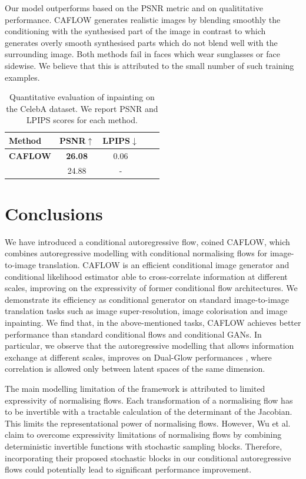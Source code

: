 Our model outperforms \cite{cGLOW} based on the PSNR metric and on qualititative performance. CAFLOW generates realistic images by blending smoothly the conditioning with the synthesised part of the image in contrast to \cite{cGLOW} which generates overly smooth synthesised parts which do not blend well with the surrounding image. Both methods fail in faces which wear sunglasses or face sidewise. We believe that this is attributed to the small number of such training examples.

\begin{table}[h!]
    \centering
    \caption{Quantitative evaluation of inpainting on the CelebA dataset. We report PSNR and LPIPS scores for each method.}\label{ch1:quantitative-evaluation-inpainting}
    \setlength{\tabcolsep}{3pt}
    \begin{tabular}{l|cccc}
     Method  &  PSNR$\uparrow$  &   LPIPS$\downarrow$    \\
    
    \midrule
      \textbf{CAFLOW} &  \textbf{26.08} & 0.06  \\
      \cite{cGLOW} & 24.88 & -
        
    \end{tabular}
    \end{table}

\section{Conclusions}\label{ch1:sec:conclusions}

We have introduced a conditional autoregressive flow, coined CAFLOW, which combines autoregressive modelling with conditional normalising flows for image-to-image translation. CAFLOW is an efficient conditional image generator and conditional likelihood estimator able to cross-correlate information at different scales, improving on the expressivity of former conditional flow architectures. 
We demonstrate its efficiency as conditional generator on standard image-to-image translation tasks such as image super-resolution, image colorisation and image inpainting. We find that, in the above-mentioned tasks, CAFLOW achieves better performance than standard conditional flows and conditional GANs. In particular, we observe that the autoregressive modelling that allows information exchange at different scales, improves on Dual-Glow performances \cite{Dual-Glow}, where correlation is allowed only between latent spaces of the same dimension.

The main modelling limitation of the framework is attributed to limited expressivity of normalising flows. Each transformation of a normalising flow has to be invertible with a tractable calculation of the determinant of the Jacobian. This limits the representational power of normalising flows. However, Wu et al. \cite{wu2020stochastic} claim to overcome expressivity limitations of normalising flows by combining deterministic invertible functions with stochastic sampling blocks. Therefore, incorporating their proposed stochastic blocks in our conditional autoregressive flows could potentially lead to significant performance improvement. 

